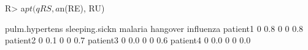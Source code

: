 \begin{Schunk}
% --begin: "comp.quant.combined"
\begin{Sinput}
R> a$pt(qRS, a$n(RE), RU)
\end{Sinput}
\begin{Soutput}
         pulm.hypertens sleeping.sickn malaria hangover influenza
patient1              0            0.8       0        0       0.8
patient2              0            0.1       0        0       0.7
patient3              0            0.0       0        0       0.6
patient4              0            0.0       0        0       0.0
\end{Soutput}
%
% --end: "comp.quant.combined"
\end{Schunk}
